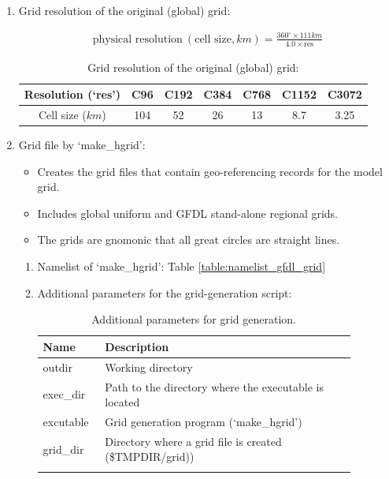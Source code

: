 \documentclass[11pt,fleqn]{report}              %
\begin{document}
\begin{enumerate}
\item Grid resolution of the original (global) grid: 

\begin{align}
\text{physical resolution} \ ( \text{cell size}, km) =  \frac{360^{\circ} \times 111km}{4.0 \times \text{res}} 
\label{eq:res_gfdl}
\end{align}


\begin{table}[ht]
\centering
\caption{Grid resolution of the original (global) grid:}
\small
{\begin{tabular}{c c c c c c c}
\hline
\hline
Resolution (`res')  & C96 & C192 & C384 & C768  &C1152 & C3072 \\
\hline
Cell size ($km$) & 104 & 52 & 26 & 13 & 8.7 & 3.25   \\
\hline
\end{tabular}}
\label{table:grid_res}
\end{table}

\item Grid file by `make\_hgrid':

\begin{itemize}
\item Creates the grid files that contain geo-referencing records for the model grid.
\item Includes global uniform and GFDL stand-alone regional grids.
\item The grids are gnomonic that all great circles are straight lines.
\end{itemize}

\begin{enumerate}
\item Namelist of `make\_hgrid': Table \ref{table:namelist_gfdl_grid}
\item Additional parameters for the grid-generation script:
{
\fontsize{10}{12}\selectfont
\begin{longtable}{ p{0.15\linewidth} | p{0.72\linewidth} }
\hline
\hline
Name & Description \\
\hline
 outdir & Working directory \\
 exec\_dir & Path to the directory where the executable is located \\
 excutable & Grid generation program (`make\_hgrid') \\
 grid\_dir & Directory where a grid file is created (\$TMPDIR/grid))\\
\hline
\caption{Additional parameters for grid generation.}
\label{table:var_gridgen}
\end{longtable}
}


\end{enumerate}
\end{enumerate}
\end{document}
